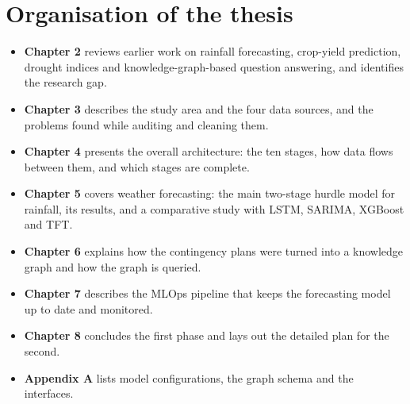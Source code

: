\section{Organisation of the thesis}
\begin{itemize}
	\item \textbf{Chapter 2} reviews earlier work on rainfall forecasting, crop-yield prediction, drought indices and knowledge-graph-based question answering, and identifies the research gap.
	\item \textbf{Chapter 3} describes the study area and the four data sources, and the problems found while auditing and cleaning them.
	\item \textbf{Chapter 4} presents the overall architecture: the ten stages, how data flows between them, and which stages are complete.
	\item \textbf{Chapter 5} covers weather forecasting: the main two-stage hurdle model for rainfall, its results, and a comparative study with LSTM, SARIMA, XGBoost and TFT.
	\item \textbf{Chapter 6} explains how the contingency plans were turned into a knowledge graph and how the graph is queried.
	\item \textbf{Chapter 7} describes the MLOps pipeline that keeps the forecasting model up to date and monitored.
	\item \textbf{Chapter 8} concludes the first phase and lays out the detailed plan for the second.
	\item \textbf{Appendix A} lists model configurations, the graph schema and the interfaces.
\end{itemize}
